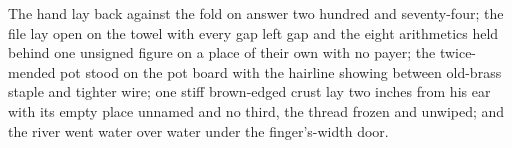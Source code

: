 The hand lay back against the fold on answer two hundred and seventy-four; the file lay open on the towel with every gap left gap and the eight arithmetics held behind one unsigned figure on a place of their own with no payer; the twice-mended pot stood on the pot board with the hairline showing between old-brass staple and tighter wire; one stiff brown-edged crust lay two inches from his ear with its empty place unnamed and no third, the thread frozen and unwiped; and the river went water over water under the finger's-width door.
